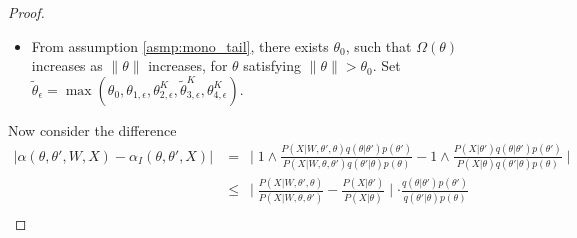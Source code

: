 \begin{proof}
\begin{itemize}
    \item From assumption \ref{asmp:mono_tail}, there exists $\theta_0$, such that $\Omega(\theta)$ increases as $\| \theta \|$ increases, for $\theta$ satisfying $\| \theta \| > \theta_0$.
Set $\tilde{\theta}_\epsilon =\max(\theta_0, \theta_{1, \epsilon},\theta_{2, \epsilon}^K,\tilde{\theta}_{3, \epsilon}^K, \theta_{4, \epsilon}^K)$. \\
  \end{itemize}
  Now consider the difference
\begin{align*}
|\alpha(\theta, \theta', W, X) - \alpha_I(\theta, \theta', X)| &= \ \mid 1 \wedge \frac{P(X | W, \theta' , \theta)q(\theta | \theta')p(\theta')}{P(X | W, \theta , \theta')q(\theta' | \theta)p(\theta)} - 1 \wedge \frac{P(X | \theta')q(\theta | \theta')p(\theta')}{P(X | \theta)q(\theta' | \theta)p(\theta)} \mid \\
& \leq \ \mid \frac{P(X | W, \theta' , \theta)}{P(X | W, \theta , \theta')} - \frac{P(X | \theta')}{P(X | \theta)}\mid  \cdot  \frac{q(\theta | \theta')p(\theta')}{q(\theta' | \theta)p(\theta)}\\
\end{align*}



\end{proof}
